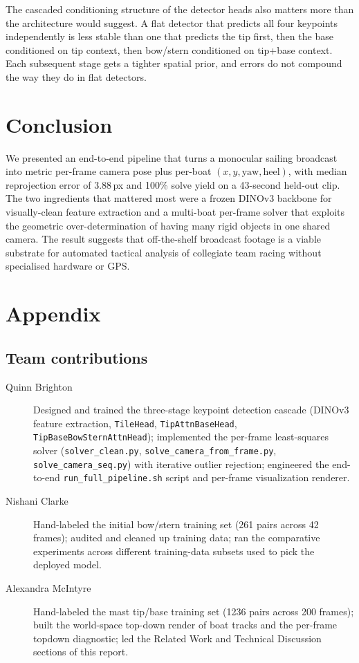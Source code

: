\documentclass[10pt,twocolumn,letterpaper]{article}
\begin{document}
The cascaded conditioning structure of the detector heads also matters more than the architecture would suggest.  A flat detector that predicts all four keypoints independently is less stable than one that predicts the tip first, then the base conditioned on tip context, then bow/stern conditioned on tip+base context.  Each subsequent stage gets a tighter spatial prior, and errors do not compound the way they do in flat detectors.

\section{Conclusion}

We presented an end-to-end pipeline that turns a monocular sailing broadcast into metric per-frame camera pose plus per-boat $(x, y, \mathrm{yaw}, \mathrm{heel})$, with median reprojection error of 3.88\,px and 100\% solve yield on a 43-second held-out clip.  The two ingredients that mattered most were a frozen DINOv3 backbone for visually-clean feature extraction and a multi-boat per-frame solver that exploits the geometric over-determination of having many rigid objects in one shared camera.  The result suggests that off-the-shelf broadcast footage is a viable substrate for automated tactical analysis of collegiate team racing without specialised hardware or GPS.

{\small


}

\section*{Appendix}

\subsection*{Team contributions}

\begin{description}
\item[Quinn Brighton] Designed and trained the three-stage keypoint detection cascade (DINOv3 feature extraction, \texttt{TileHead}, \texttt{TipAttnBaseHead}, \texttt{TipBaseBowSternAttnHead}); implemented the per-frame least-squares solver (\texttt{solver\_clean.py}, \texttt{solve\_camera\_from\_frame.py}, \texttt{solve\_camera\_seq.py}) with iterative outlier rejection; engineered the end-to-end \texttt{run\_full\_pipeline.sh} script and per-frame visualization renderer.
\item[Nishani Clarke] Hand-labeled the initial bow/stern training set (261 pairs across 42 frames); audited and cleaned up training data; ran the comparative experiments across different training-data subsets used to pick the deployed model.
\item[Alexandra McIntyre] Hand-labeled the mast tip/base training set (1236 pairs across 200 frames); built the world-space top-down render of boat tracks and the per-frame topdown diagnostic; led the Related Work and Technical Discussion sections of this report.
\end{description}
\end{document}
